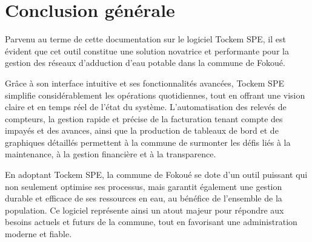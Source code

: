 \chapter*{Conclusion générale}

Parvenu au terme de cette documentation sur le logiciel Tockem SPE, il est évident que cet outil constitue une solution novatrice et performante pour la gestion des réseaux d'adduction d'eau potable dans la commune de Fokoué.

Grâce à son interface intuitive et ses fonctionnalités avancées, Tockem SPE simplifie considérablement les opérations quotidiennes, tout en offrant une vision claire et en temps réel de l'état du système. L'automatisation des relevés de compteurs, la gestion rapide et précise de la facturation tenant compte des impayés et des avances, ainsi que la production de tableaux de bord et de graphiques détaillés permettent à la commune de surmonter les défis liés à la maintenance, à la gestion financière et à la transparence.

En adoptant Tockem SPE, la commune de Fokoué se dote d'un outil puissant qui non seulement optimise ses processus, mais garantit également une gestion durable et efficace de ses ressources en eau, au bénéfice de l'ensemble de la population. Ce logiciel représente ainsi un atout majeur pour répondre aux besoins actuels et futurs de la commune, tout en favorisant une administration moderne et fiable.
